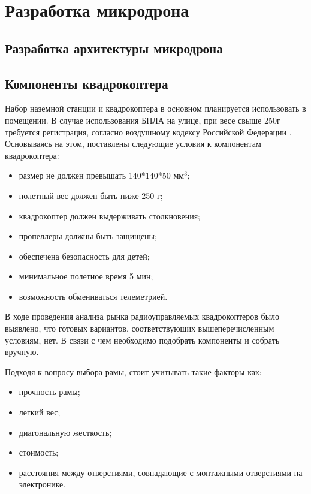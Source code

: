 
\section{Разработка микродрона}
\subsection{Разработка архитектуры микродрона}
\subsection{Компоненты квадрокоптера}

Набор наземной станции и квадрокоптера в основном планируется использовать в помещении. В случае использования БПЛА на улице, при весе свыше 250г требуется регистрация, согласно воздушному кодексу Российской Федерации \cite{ivp}. Основываясь на этом, поставлены следующие условия к компонентам квадрокоптера:
\begin{itemize}
	\item размер не должен превышать 140*140*50 \(мм^3\);
	\item полетный вес должен быть ниже 250 г;
	\item квадрокоптер должен выдерживать столкновения;
	\item пропеллеры должны быть защищены;
	\item обеспечена безопасность для детей;
	\item минимальное полетное время 5 мин;
	\item возможность обмениваться телеметрией.
\end{itemize}

В ходе проведения анализа рынка радиоуправляемых квадрокоптеров было выявлено, что готовых вариантов, соответствующих вышеперечисленным условиям, нет. В связи с чем необходимо подобрать компоненты и собрать вручную.

Подходя к вопросу выбора рамы, стоит учитывать такие факторы как:
\begin{itemize}
	\item прочность рамы;
	\item легкий вес;
	\item диагональную жесткость;
	\item стоимость;
	\item расстояния между отверстиями, совпадающие с монтажными отверстиями на электронике.
\end{itemize}

